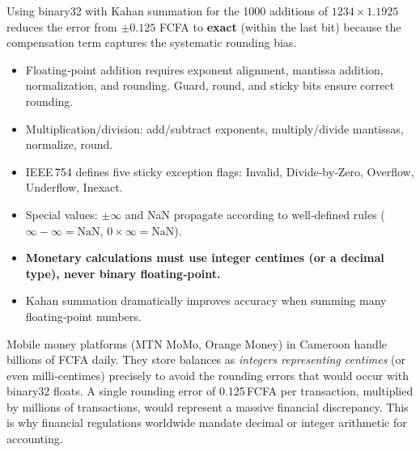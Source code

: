 \documentclass[11pt]{article}
\begin{document}
\begin{exemplebox}
Using binary32 with Kahan summation for the 1000 additions of $1234 \times 1.1925$ reduces the error from $\pm 0.125$ FCFA to \textbf{exact} (within the last bit) because the compensation term captures the systematic rounding bias.
\end{exemplebox}

\begin{aretenir}
\begin{itemize}
\item Floating‑point addition requires exponent alignment, mantissa addition, normalization, and rounding. Guard, round, and sticky bits ensure correct rounding.
\item Multiplication/division: add/subtract exponents, multiply/divide mantissas, normalize, round.
\item IEEE\,754 defines five sticky exception flags: Invalid, Divide‑by‑Zero, Overflow, Underflow, Inexact.
\item Special values: $\pm\infty$ and NaN propagate according to well‑defined rules ($\infty - \infty = \text{NaN}$, $0 \times \infty = \text{NaN}$).
\item \textbf{Monetary calculations must use integer centimes (or a decimal type), never binary floating‑point.}
\item Kahan summation dramatically improves accuracy when summing many floating‑point numbers.
\end{itemize}
\end{aretenir}

\begin{savaistu}
Mobile money platforms (MTN MoMo, Orange Money) in Cameroon handle billions of FCFA daily. They store balances as \emph{integers representing centimes} (or even milli‑centimes) precisely to avoid the rounding errors that would occur with binary32 floats. A single rounding error of 0.125\,FCFA per transaction, multiplied by millions of transactions, would represent a massive financial discrepancy. This is why financial regulations worldwide mandate decimal or integer arithmetic for accounting.
\end{savaistu}
\end{document}
